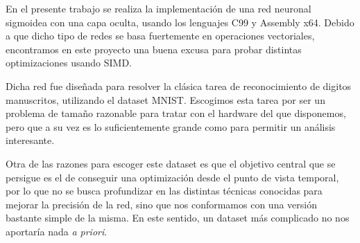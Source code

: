 
En el presente trabajo se realiza la implementación de una red neuronal sigmoidea con una capa oculta, usando los lenguajes C99 y Assembly x64. Debido a que dicho tipo de redes se basa fuertemente en operaciones vectoriales, encontramos en este proyecto una buena excusa para probar distintas optimizaciones usando SIMD. 

Dicha red fue diseñada para resolver la clásica tarea de reconocimiento de digitos manuscritos, utilizando el dataset MNIST. Escogimos esta tarea por ser un problema de tamaño razonable para tratar con el hardware del que disponemos, pero que a su vez es lo suficientemente grande como para permitir un análisis interesante.

Otra de las razones para escoger este dataset es que el objetivo central que se persigue es el de conseguir una optimización desde el punto de vista temporal, por lo que no se busca profundizar en las distintas técnicas conocidas para mejorar la precisión de la red, sino que nos conformamos con una versión bastante simple de la misma. En este sentido, un dataset más complicado no nos aportaría nada \textit{a priori}.